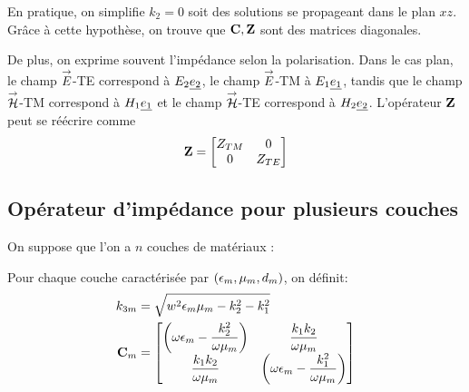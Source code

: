         En pratique, on simplifie $k_2 = 0$ soit des solutions se propageant dans le plan $xz$. Grâce à cette hypothèse, on trouve que $\mC, \mZ$ sont des matrices diagonales. 

        De plus, on exprime souvent l'impédance selon la polarisation. Dans le cas plan, le champ $\vE$-TE correspond à $E_2 \v{e_2}$, le champ $\vE$-TM à $E_1 \v{e_1}$, tandis que le champ $\vH$-TM correspond à $H_1 \v{e_1}$ et le champ $\vH$-TE correspond à $H_2 \v{e_2}$.
        L'opérateur $\mZ$ peut se réécrire comme 
        \begin{equation}
            \mZ = 
            \begin{bmatrix}
                Z_{TM} & 0 
                \\
                0 & Z_{TE}
            \end{bmatrix}
        \end{equation}


    \subsection{Opérateur d'impédance pour plusieurs couches}
        On suppose que l'on a $n$ couches de matériaux : 

        \begin{figure}[h!btp]
            \centering
            \begin{tikzpicture}
                
            \end{tikzpicture}
        \end{figure}

        Pour chaque couche caractérisée par $(\eps_m,\mu_m,d_m)$, on définit:
        \begin{align}
        k_{3m} &= \sqrt{w^2\eps_m\mu_m - k_2^2 - k_1^2}
        \\
        \mC_m &=
            \begin{bmatrix}
                \left(\w\eps_m-\frac{k_2^2}{\w\mu_m}\right) & \frac{k_1k_2}{\w\mu_m}\\
                \frac{k_1k_2}{\w\mu_m} & \left(\w\eps_m-\frac{k_1^2}{\w\mu_m}\right)
            \end{bmatrix}
        \end{align}

